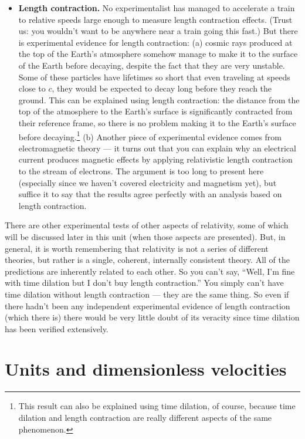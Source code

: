 \begin{itemize}
\item {\bf Length contraction.}  No experimentalist has managed to
accelerate a train to relative speeds large enough to measure length
contraction effects.  (Trust us: you wouldn't want to be anywhere near
a train going this fast.)  But there is experimental evidence for
length contraction: (a) cosmic rays produced at the top of the Earth's
atmosphere somehow manage to make it to the surface of the Earth
before decaying, despite the fact that they are very unstable.  Some
of these particles have lifetimes so short that even traveling at
speeds close to $c$, they would be expected to decay long before they
reach the ground.  This can be explained using length contraction: the
distance from the top of the atmosphere to the Earth's surface is
significantly contracted from their reference frame, so there is no
problem making it to the Earth's surface before
decaying.\footnote{This result can also be explained using time
dilation, of course, because time dilation and length contraction are
really different aspects of the same phenomenon.} (b) Another piece of
experimental evidence comes from electromagnetic theory --- it turns out
that you can explain why an electrical current produces magnetic
effects by applying relativistic length contraction to the stream of
electrons.  The argument is too long to present here (especially since
we haven't covered electricity and magnetism yet), but suffice it to
say that the results agree perfectly with an analysis based on length
contraction.
\end{itemize}
   
There are other experimental tests of other aspects of relativity,
some of which will be discussed later in this unit (when those aspects
are presented).  But, in general, it is worth remembering that
relativity is not a series of different theories, but rather is a
single, coherent, internally consistent theory.  All of the
predictions are inherently related to each other.  So you can't say,
``Well, I'm fine with time dilation but I don't buy length
contraction.''  You simply can't have time dilation without length
contraction --- they are the same thing. So even if there hadn't been
any independent experimental evidence of length contraction (which
there is) there would be very little doubt of its veracity since time
dilation has been verified extensively.

\section{Units and dimensionless velocities}

